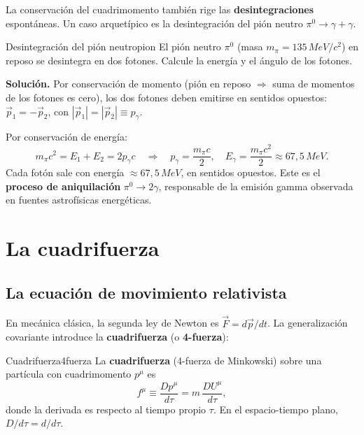 La conservación del cuadrimomento también rige las \textbf{desintegraciones} espontáneas. Un caso arquetípico es la desintegración del pión neutro $\pi^0 \to \gamma + \gamma$.

\begin{ejemplo}{Desintegración del pión neutro}{pion}
El pión neutro $\pi^0$ (masa $m_\pi = 135\,\si{MeV}/c^2$) en reposo se desintegra en dos fotones. Calcule la energía y el ángulo de los fotones.

\textbf{Solución.} Por conservación de momento (pión en reposo $\Rightarrow$ suma de momentos de los fotones es cero), los dos fotones deben emitirse en sentidos opuestos: $\vec{p}_1 = -\vec{p}_2$, con $|\vec{p}_1| = |\vec{p}_2| \equiv p_\gamma$.

Por conservación de energía:
\[
  m_\pi c^2 = E_1 + E_2 = 2p_\gamma c
  \quad\Rightarrow\quad p_\gamma = \frac{m_\pi c}{2},\quad E_\gamma = \frac{m_\pi c^2}{2} \approx 67{,}5\,\si{MeV}.
\]
Cada fotón sale con energía $\approx 67{,}5\,\si{MeV}$, en sentidos opuestos. Este es el \textbf{proceso de aniquilación} $\pi^0 \to 2\gamma$, responsable de la emisión gamma observada en fuentes astrofísicas energéticas.
\end{ejemplo}

\section{La cuadrifuerza}

\subsection{La ecuación de movimiento relativista}

En mecánica clásica, la segunda ley de Newton es $\vec{F} = d\vec{p}/dt$. La generalización covariante introduce la \textbf{cuadrifuerza} (o \textbf{4-fuerza}):

\begin{definicion}{Cuadrifuerza}{4fuerza}
La \textbf{cuadrifuerza} (4-fuerza de Minkowski) sobre una partícula con cuadrimomento $p^\mu$ es
\begin{equation}
  f^\mu \equiv \frac{Dp^\mu}{d\tau} = m\,\frac{DU^\mu}{d\tau},
  \label{eq:4fuerza}
\end{equation}
donde la derivada es respecto al tiempo propio $\tau$. En el espacio-tiempo plano, $D/d\tau = d/d\tau$.
\end{definicion}

